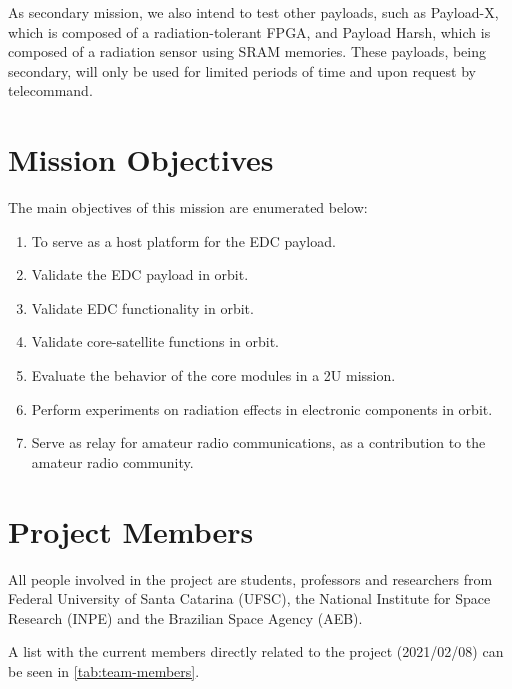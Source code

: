 As secondary mission, we also intend to test other payloads, such as Payload-X, which is composed of a radiation-tolerant FPGA, and Payload Harsh, which is composed of a radiation sensor using SRAM memories. These payloads, being secondary, will only be used for limited periods of time and upon request by telecommand.

\section{Mission Objectives}

The main objectives of this mission are enumerated below:

\begin{enumerate}
    \item To serve as a host platform for the EDC payload.
    \item Validate the EDC payload in orbit.
    \item Validate EDC functionality in orbit.
    \item Validate core-satellite functions in orbit.
    \item Evaluate the behavior of the core modules in a 2U mission.
    \item Perform experiments on radiation effects in electronic components in orbit.
    \item Serve as relay for amateur radio communications, as a contribution to the amateur radio community.
\end{enumerate}

\section{Project Members}

All people involved in the project are students, professors and researchers from Federal University of Santa Catarina (UFSC), the National Institute for Space Research (INPE) and the Brazilian Space Agency (AEB).

A list with the current members directly related to the project (2021/02/08) can be seen in \autoref{tab:team-members}.

